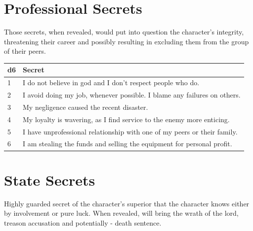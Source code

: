 \newpage
\section{Professional Secrets}

Those secrets, when revealed, would put into question the character's integrity, threatening their career and possibly resulting in excluding them from the group of their peers.

\noindent
\begin{tabular}{p{0.5cm} p{7cm}}
	\color{black} d6 & \color{black} Secret \\ \hline
	
	\color{black} 1 & \color{black} I do not believe in god and I don't respect people who do. \\
	
	\color{black} 2 & \color{black} I avoid doing my job, whenever possible. I blame any failures on others. \\
	
	\color{black} 3 & \color{black} My negligence caused the recent disaster. \\
	
	\color{black} 4 & \color{black} My loyalty is wavering, as I find service to the enemy more enticing. \\
	
	\color{black} 5 & \color{black} I have unprofessional relationship with one of my peers or their family. \\
	
	\color{black} 6 & \color{black} I am stealing the funds and selling the equipment for personal profit. \\
\end{tabular}




\section{State Secrets}

Highly guarded secret of the character's superior that the character knows either by involvement or pure luck. When revealed, will bring the wrath of the lord, treason accusation and potentially - death sentence. 

